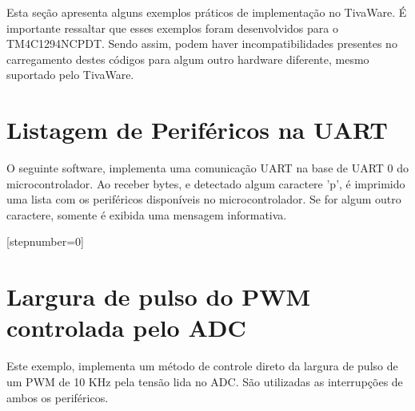 Esta seção apresenta alguns exemplos práticos de implementação no TivaWare. É importante ressaltar que esses exemplos foram desenvolvidos para o TM4C1294NCPDT. Sendo assim, podem haver incompatibilidades presentes no carregamento destes códigos para algum outro hardware diferente, mesmo suportado pelo TivaWare.

\minitocsection

\section{Listagem de Periféricos na UART}

O seguinte software, implementa uma comunicação UART na base de UART 0 do microcontrolador. Ao receber bytes, e detectado algum caractere 'p', é imprimido uma lista com os periféricos disponíveis no microcontrolador. Se for algum outro caractere, somente é exibida uma mensagem informativa.

[stepnumber=0]

\section{Largura de pulso do PWM controlada pelo ADC}

Este exemplo, implementa um método de controle direto da largura de pulso de um PWM de 10 KHz  pela tensão lida no ADC. São utilizadas as interrupções de ambos os periféricos.


